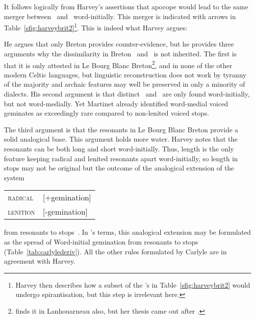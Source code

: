 It follows logically from Harvey's assertions that apocope would lead to the same merger between \lT\ and \xD\ word-initially. This merger is indicated with arrows in Table~\ref{sfig:harveybrit2}\footnote{Harvey then describes how a subset of the 's in Table~\ref{sfig:harveybrit2} would  undergo spirantisation, but this step is irrelevant here.}. This is indeed what Harvey argues:

He argues that only Breton provides counter-evidence, but he provides three arguments why the dissimilarity in Breton \lT\ and \xD\ is not inherited. The first is that it is only attested in Le Bourg Blanc Breton\footnote{\Textcite{carlyle_syllabic_1988} finds it in Lanhouarneau also, but her thesis came out after \textcite{harvey_aspects_1984}.}, and in none of the other modern Celtic languages, but linguistic reconstruction does not work by tyranny of the majority and archaic features may well be preserved in only a minority of dialects. His second argument is that distinct \lT\ and \xD\ are only found word-initially, but not word-medially. Yet Martinet already identified word-medial voiced geminates as exceedingly rare compared to non-lenited voiced stops.

The third argument is that the resonants in Le Bourg Blanc Breton provide a solid analogical base. This argument holds more water. Harvey notes that the resonants  can be both long and short word-initially. Thus, length is the only feature keeping radical and lenited resonants apart word-initially, so length in stops may not be original but the outcome of the analogical extension of the system
\begin{center}
  \begin{tabular}{l@{~=~}l}
    \textsc{radical}  & [+gemination]\\
    \textsc{lenition} & [-gemination]
  \end{tabular}
\end{center}
from resonants to stops~\autocite{harvey_aspects_1984}. In \textcite{carlyle_syllabic_1988}'s terms, this analogical extension may be formulated as the spread of Word-initial gemination from resonants to stops (Table~\ref{tab:carlylederiv}). All the other rules formulated by Carlyle are in agreement with Harvey.

